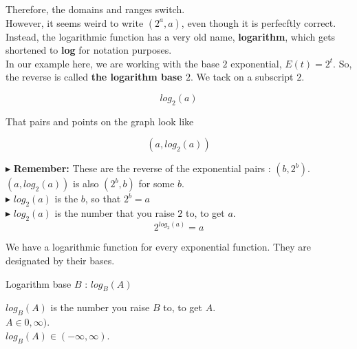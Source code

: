 \documentclass{ximera}
\begin{document}
Therefore, the domains and ranges switch. \\








However, it seems weird to write $(2^a, a)$, even though it is perfecftly correct.  Instead, the logarithmic function has a very old name, \textbf{logarithm}, which gets shortened to \textbf{log} for notation purposes.  \\



In our example here, we are working with the base $2$ exponential, $E(t) = 2^t$. So, the reverse is called \textbf{the logarithm base $2$}.  We tack on a subscript $2$.



\[   log_2(a)     \]


That pairs and points on the graph look like 


\[
(a, log_2(a))
\]


$\blacktriangleright$ \textbf{Remember:} These are the reverse of the exponential pairs : $(b, 2^b)$.  $(a, log_2(a))$ is also $(2^b, b)$ for some $b$. \\

$\blacktriangleright$  $log_2(a)$ is the $b$, so that $2^b = a$ \\


$\blacktriangleright$  $log_2(a)$ is the number that you raise $2$ to, to get $a$.  \\

\[   2^{log_2(a)} = a     \]

We have a logarithmic function for every exponential function.  They are designated by their bases.
















\begin{definition}  Logarithm base $B$ : $log_B(A)$


$log_B(A)$ is the number you raise $B$ to, to get $A$. \\

$A \in 0, \infty)$. \\

$log_B(A) \in (-\infty, \infty)$.


\end{definition}
\end{document}

